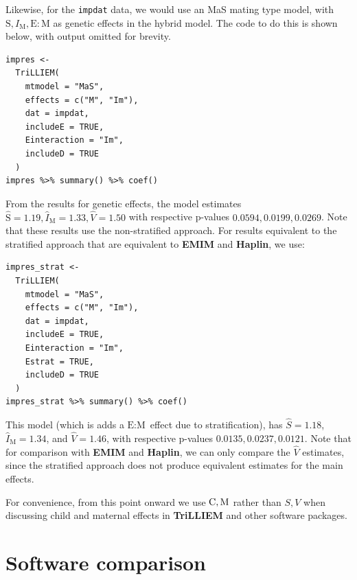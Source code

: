 Likewise, for the \texttt{impdat} data, we would use an MaS mating type model, with $\textrm{S}, I_{\textrm{M}}, \textrm{E}:\textrm{M}$ as genetic effects in the hybrid model.
The code to do this is shown below, with output omitted for brevity.
\begin{verbatim}
impres <-
  TriLLIEM(
    mtmodel = "MaS",
    effects = c("M", "Im"),
    dat = impdat,
    includeE = TRUE,
    Einteraction = "Im",
    includeD = TRUE
  )
impres %>% summary() %>% coef()
\end{verbatim}
From the results for genetic effects, the model estimates $\hat{\textrm{S}} = 1.19, \hat{I}_{\textrm{M}} = 1.33, \hat{V} = 1.50$ with respective p-values $0.0594, 0.0199, 0.0269$.
Note that these results use the non-stratified approach.
For results equivalent to the stratified approach that are equivalent to \textbf{EMIM} and \textbf{Haplin}, we use:
\begin{verbatim}
impres_strat <-
  TriLLIEM(
    mtmodel = "MaS",
    effects = c("M", "Im"),
    dat = impdat,
    includeE = TRUE,
    Einteraction = "Im",
    Estrat = TRUE,
    includeD = TRUE
  )
impres_strat %>% summary() %>% coef()
\end{verbatim}
This model (which is adds a $\textrm{E}:\text{M}$ effect due to stratification), has $\hat{S} = 1.18$, $\hat{I}_\textrm{M} = 1.34$, and $\hat{V} = 1.46$, with respective p-values $0.0135, 0.0237, 0.0121$.
Note that for comparison with \textbf{EMIM} and \textbf{Haplin}, we can only compare the $\hat{V}$ estimates, since the stratified approach does not produce equivalent estimates for the main effects.

For convenience, from this point onward we use ${\rm C}, {\rm M}$ rather than $S, V$ when discussing child and maternal effects in \textbf{TriLLIEM} and other software packages.

\section{Software comparison}\label{sec:compare}

